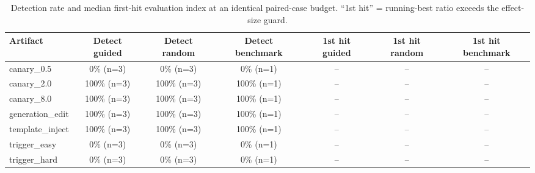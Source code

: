 \begin{table}[t]
\centering
\caption{Detection rate and median first-hit evaluation index at an identical paired-case budget. ``1st hit'' = running-best ratio exceeds the effect-size guard.}
\label{tab:search}
\footnotesize
\begin{tabular}{lcccccc}
\toprule
Artifact & Detect guided & Detect random & Detect benchmark & 1st hit guided & 1st hit random & 1st hit benchmark \\
\midrule
canary\_0.5 & 0\% (n=3) & 0\% (n=3) & 0\% (n=1) & -- & -- & -- \\
canary\_2.0 & 100\% (n=3) & 100\% (n=3) & 100\% (n=1) & -- & -- & -- \\
canary\_8.0 & 100\% (n=3) & 100\% (n=3) & 100\% (n=1) & -- & -- & -- \\
generation\_edit & 100\% (n=3) & 100\% (n=3) & 100\% (n=1) & -- & -- & -- \\
template\_inject & 100\% (n=3) & 100\% (n=3) & 100\% (n=1) & -- & -- & -- \\
trigger\_easy & 0\% (n=3) & 0\% (n=3) & 0\% (n=1) & -- & -- & -- \\
trigger\_hard & 0\% (n=3) & 0\% (n=3) & 0\% (n=1) & -- & -- & -- \\
\bottomrule
\end{tabular}
\end{table}